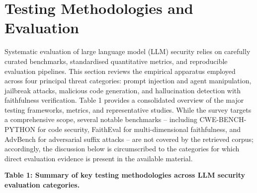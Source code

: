 \documentclass[11pt,a4paper]{article}
\begin{document}
\section{Testing Methodologies and Evaluation}

Systematic evaluation of large language model (LLM) security relies on carefully curated benchmarks, standardised quantitative metrics, and reproducible evaluation pipelines. This section reviews the empirical apparatus employed across four principal threat categories: prompt injection and agent manipulation, jailbreak attacks, malicious code generation, and hallucination detection with faithfulness verification. Table 1 provides a consolidated overview of the major testing frameworks, metrics, and representative studies. While the survey targets a comprehensive scope, several notable benchmarks -- including CWE-BENCH-PYTHON for code security, FaithEval for multi-dimensional faithfulness, and AdvBench for adversarial suffix attacks -- are not covered by the retrieved corpus; accordingly, the discussion below is circumscribed to the categories for which direct evaluation evidence is present in the available material.

\textbf{Table 1: Summary of key testing methodologies across LLM security evaluation categories.}
\end{document}
